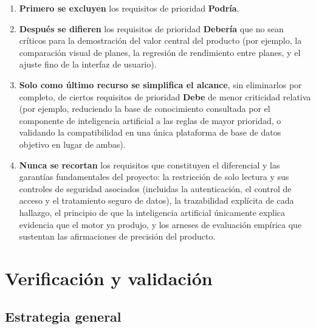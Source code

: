 \documentclass[11pt,a4paper]{report}
\begin{document}
\begin{enumerate}
\item \textbf{Primero se excluyen} los requisitos de prioridad \textbf{Podr\'ia}.
\item \textbf{Despu\'es se difieren} los requisitos de prioridad \textbf{Deber\'ia} que no sean cr\'iticos para la demostraci\'on del valor central del producto (por ejemplo, la comparaci\'on visual de planes, la regresi\'on de rendimiento entre planes, y el ajuste fino de la interfaz de usuario).
\item \textbf{Solo como \'ultimo recurso se simplifica el alcance}, sin eliminarlos por completo, de ciertos requisitos de prioridad \textbf{Debe} de menor criticidad relativa (por ejemplo, reduciendo la base de conocimiento consultada por el componente de inteligencia artificial a las reglas de mayor prioridad, o validando la compatibilidad en una \'unica plataforma de base de datos objetivo en lugar de ambas).
\item \textbf{Nunca se recortan} los requisitos que constituyen el diferencial y las garant\'ias fundamentales del proyecto: la restricci\'on de solo lectura y sus controles de seguridad asociados (incluidas la autenticaci\'on, el control de acceso y el tratamiento seguro de datos), la trazabilidad expl\'icita de cada hallazgo, el principio de que la inteligencia artificial \'unicamente explica evidencia que el motor ya produjo, y los arneses de evaluaci\'on emp\'irica que sustentan las afirmaciones de precisi\'on del producto.
\end{enumerate}

\chapter{Verificaci\'on y validaci\'on}
\label{ch:verificacion}

\section{Estrategia general}
\end{document}
